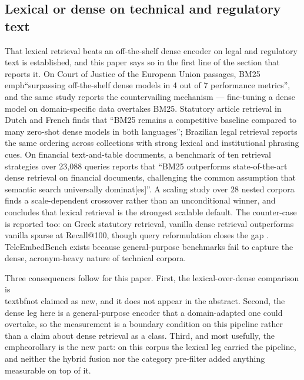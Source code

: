 \documentclass[preprint,3p,times]{elsarticle}
\begin{document}
\subsection{Lexical or dense on technical and regulatory text}

That lexical retrieval beats an off-the-shelf dense encoder on legal and
regulatory text is established, and this paper says so in the first line of
the section that reports it. On Court of Justice of the European Union
passages, BM25 \\emph{``surpassing off-the-shelf dense models in 4 out of 7
performance metrics''}, and the same study reports the countervailing
mechanism --- fine-tuning a dense model on domain-specific data overtakes
BM25\cite{mori2025lexical}. Statutory article retrieval in Dutch and French
finds that ``BM25 remains a competitive baseline compared to many zero-shot
dense models in both languages''\cite{lotfi2024bsard}; Brazilian legal
retrieval reports the same ordering across collections with strong lexical
and institutional phrasing cues\cite{pereira2026jua}. On financial
text-and-table documents, a benchmark of ten retrieval strategies over
23{,}088 queries reports that ``BM25 outperforms state-of-the-art dense
retrieval on financial documents, challenging the common assumption that
semantic search universally dominat[es]''\cite{akarsu2026bm25}. A scaling
study over 28 nested corpora finds a scale-dependent crossover rather than an
unconditional winner, and concludes that lexical retrieval is the strongest
scalable default\cite{wang2026bm25scale}. The counter-case is reported too:
on Greek statutory retrieval, vanilla dense retrieval outperforms vanilla
sparse at Recall@100, though query reformulation closes the gap
\cite{beta2026greekbar}. TeleEmbedBench\cite{gajjar2026teleembed} exists
because general-purpose benchmarks fail to capture the dense, acronym-heavy
nature of technical corpora.

Three consequences follow for this paper. First, the lexical-over-dense
comparison is \\textbf{not} claimed as new, and it does not appear in the
abstract. Second, the dense leg here is a general-purpose encoder that a
domain-adapted one could overtake, so the measurement is a boundary
condition on this pipeline rather than a claim about dense retrieval as a
class. Third, and most usefully, the \\emph{corollary} is the new part: on
this corpus the lexical leg carried the pipeline, and neither the hybrid
fusion nor the category pre-filter added anything measurable on top of it.
\end{document}
